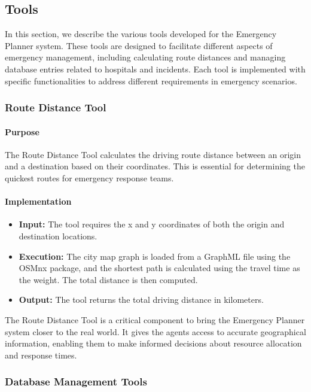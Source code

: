 \subsection{Tools}\label{sec:tools}

In this section, we describe the various tools developed for the Emergency Planner system. These tools are designed to facilitate different aspects of emergency management, including calculating route distances and managing database entries related to hospitals and incidents. Each tool is implemented with specific functionalities to address different requirements in emergency scenarios.

\subsubsection{Route Distance Tool}

\paragraph{Purpose}
The Route Distance Tool calculates the driving route distance between an origin and a destination based on their coordinates. This is essential for determining the quickest routes for emergency response teams.

\paragraph{Implementation}
\begin{itemize}
    \item \textbf{Input:} The tool requires the x and y coordinates of both the origin and destination locations.
    \item \textbf{Execution:} The city map graph is loaded from a GraphML file using the OSMnx \cite{osmnx} package, and the shortest path is calculated using the travel time as the weight. The total distance is then computed.
    \item \textbf{Output:} The tool returns the total driving distance in kilometers.
\end{itemize}

The Route Distance Tool is a critical component to bring the Emergency Planner system closer to the real world. It gives the agents access to accurate geographical information, enabling them to make informed decisions about resource allocation and response times.

\subsubsection{Database Management Tools}

